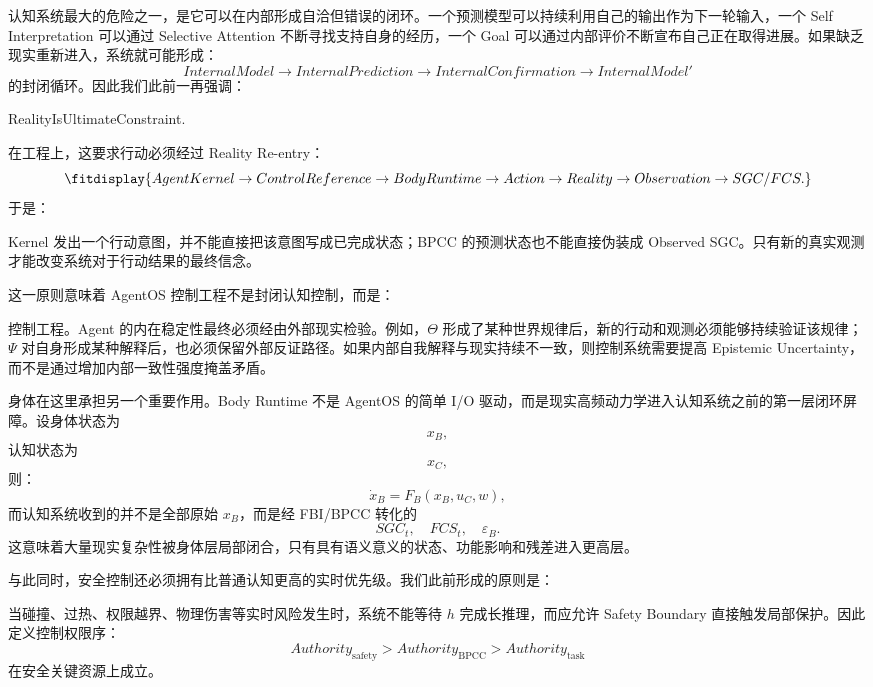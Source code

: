 认知系统最大的危险之一，是它可以在内部形成自洽但错误的闭环。一个预测模型可以持续利用自己的输出作为下一轮输入，一个 Self Interpretation 可以通过 Selective Attention 不断寻找支持自身的经历，一个 Goal 可以通过内部评价不断宣布自己正在取得进展。如果缺乏现实重新进入，系统就可能形成：
\[
InternalModel
\rightarrow
InternalPrediction
\rightarrow
InternalConfirmation
\rightarrow
InternalModel'
\]
的封闭循环。因此我们此前一再强调：
\begin{statementbox}
RealityIsUltimateConstraint.
\end{statementbox}

在工程上，这要求行动必须经过 Reality Re-entry：
\[
\fitdisplay{
AgentKernel
\rightarrow
ControlReference
\rightarrow
BodyRuntime
\rightarrow
Action
\rightarrow
Reality
\rightarrow
Observation
\rightarrow
SGC/FCS.
}
\]
于是：
\begin{statementbox}
\centering
{}
\end{statementbox}
Kernel 发出一个行动意图，并不能直接把该意图写成已完成状态；BPCC 的预测状态也不能直接伪装成 Observed SGC。只有新的真实观测才能改变系统对于行动结果的最终信念。

这一原则意味着 AgentOS 控制工程不是封闭认知控制，而是：
\begin{statementbox}
\centering
{}
\end{statementbox}
控制工程。Agent 的内在稳定性最终必须经由外部现实检验。例如，$\Theta$ 形成了某种世界规律后，新的行动和观测必须能够持续验证该规律；$\Psi$ 对自身形成某种解释后，也必须保留外部反证路径。如果内部自我解释与现实持续不一致，则控制系统需要提高 Epistemic Uncertainty，而不是通过增加内部一致性强度掩盖矛盾。

身体在这里承担另一个重要作用。Body Runtime 不是 AgentOS 的简单 I/O 驱动，而是现实高频动力学进入认知系统之前的第一层闭环屏障。设身体状态为
\[
x_B,
\]
认知状态为
\[
x_C,
\]
则：
\[
\dot x_B
=
F_B(
x_B,u_C,w
),
\]
而认知系统收到的并不是全部原始 $x_B$，而是经 FBI/BPCC 转化的
\[
SGC_t,\quad FCS_t,\quad \varepsilon_B.
\]
这意味着大量现实复杂性被身体层局部闭合，只有具有语义意义的状态、功能影响和残差进入更高层。

与此同时，安全控制还必须拥有比普通认知更高的实时优先级。我们此前形成的原则是：
\begin{statementbox}
\centering
{}
\end{statementbox}
当碰撞、过热、权限越界、物理伤害等实时风险发生时，系统不能等待 $h$ 完成长推理，而应允许 Safety Boundary 直接触发局部保护。因此定义控制权限序：
\[
Authority_{\mathrm{safety}}
>
Authority_{\mathrm{BPCC}}
>
Authority_{\mathrm{task}}
\]
在安全关键资源上成立。

